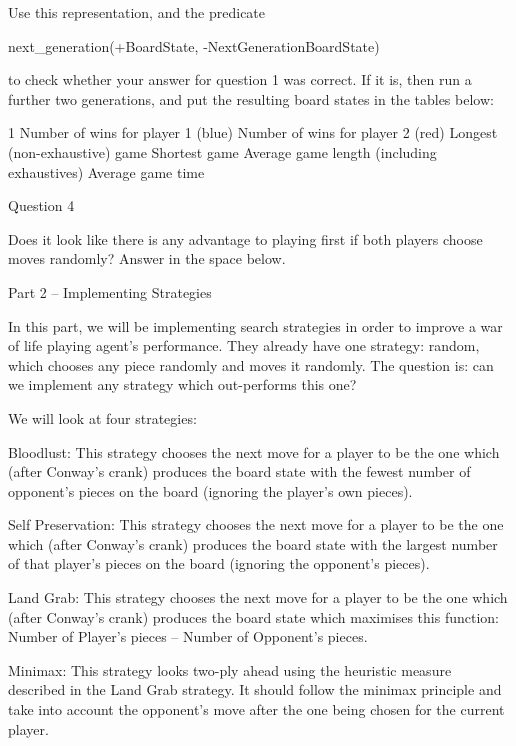 \documentclass[a4wide, 11pt]{article}
\begin{document}
\textbar{} \textbar{}

Use this representation, and the predicate

next\_generation(+BoardState, -NextGenerationBoardState)

to check whether your answer for question 1 was correct. If it is, then
run a further two generations, and put the resulting board states in the
tables below:

\textbar{} \textbar{}1 \textbar{} \textbar{}Number of wins for player 1
(blue) \textbar{} \textbar{} \textbar{}Number of wins for player 2 (red)
\textbar{} \textbar{} \textbar{}Longest (non-exhaustive) game \textbar{}
\textbar{} \textbar{}Shortest game \textbar{} \textbar{}
\textbar{}Average game length (including \textbar{} \textbar{}
\textbar{}exhaustives) \textbar{} \textbar{} \textbar{}Average game time
\textbar{} \textbar{}

Question 4

Does it look like there is any advantage to playing first if both
players choose moves randomly? Answer in the space below.

Part 2 -- Implementing Strategies

In this part, we will be implementing search strategies in order to
improve a war of life playing agent's performance. They already have one
strategy: random, which chooses any piece randomly and moves it
randomly. The question is: can we implement any strategy which
out-performs this one?

We will look at four strategies:

Bloodlust: This strategy chooses the next move for a player to be the
one which (after Conway's crank) produces the board state with the
fewest number of opponent's pieces on the board (ignoring the player's
own pieces).

Self Preservation: This strategy chooses the next move for a player to
be the one which (after Conway's crank) produces the board state with
the largest number of that player's pieces on the board (ignoring the
opponent's pieces).

Land Grab: This strategy chooses the next move for a player to be the
one which (after Conway's crank) produces the board state which
maximises this function: Number of Player's pieces -- Number of
Opponent's pieces.

Minimax: This strategy looks two-ply ahead using the heuristic measure
described in the Land Grab strategy. It should follow the minimax
principle and take into account the opponent's move after the one being
chosen for the current player.
\end{document}
